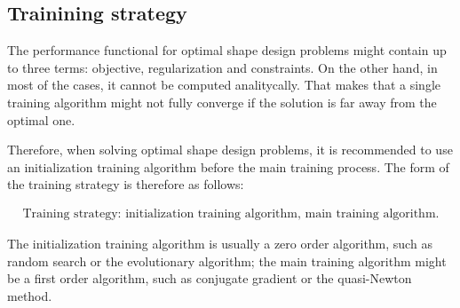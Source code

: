\subsection*{Trainining strategy}

The performance functional for optimal shape design problems might contain up to three terms: 
objective, regularization and constraints. 
On the other hand, in most of the cases, it cannot be computed analitycally. 
That makes that a single training algorithm might not fully converge if the solution is far away from the optimal one. 

Therefore, when solving optimal shape design problems, it is recommended to use an initialization training algorithm before the main training process. 
The form of the training strategy is therefore as follows:

\begin{eqnarray}\nonumber
\text{Training strategy: initialization training algorithm, main training algorithm}. 
\end{eqnarray}

The initialization training algorithm is usually a zero order algorithm, such as random search or the evolutionary algorithm;
the main training algorithm might be a first order algorithm, such as conjugate gradient or the quasi-Newton method. 
